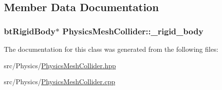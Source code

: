 \subsection{Member Data Documentation}
\subsubsection[{\texorpdfstring{\+\_\+rigid\+\_\+body}{_rigid_body}}]{\setlength{\rightskip}{0pt plus 5cm}bt\+Rigid\+Body$\ast$ Physics\+Mesh\+Collider\+::\+\_\+rigid\+\_\+body\hspace{0.3cm}{\ttfamily [private]}}\hypertarget{classPhysicsMeshCollider_a79bf728a386ac89b63c4ded82af6762b}{}\label{classPhysicsMeshCollider_a79bf728a386ac89b63c4ded82af6762b}


The documentation for this class was generated from the following files\+:\begin{DoxyCompactItemize}
\item 
src/\+Physics/\hyperlink{PhysicsMeshCollider_8hpp}{Physics\+Mesh\+Collider.\+hpp}\item 
src/\+Physics/\hyperlink{PhysicsMeshCollider_8cpp}{Physics\+Mesh\+Collider.\+cpp}\end{DoxyCompactItemize}
